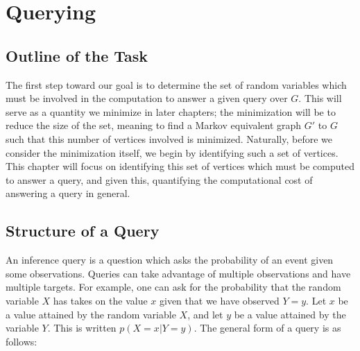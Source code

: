 \chapter{Querying}


\section{Outline of the Task}



\null \quad \quad The first step toward our goal is to determine the set of random variables which must be involved in the computation to answer a given query over $G$. This will serve as a quantity we minimize in later chapters; the minimization will be to reduce the size of the set, meaning to find a Markov equivalent graph $G'$ to $G$ such that this number of vertices involved is minimized. \newline
\null \quad \quad Naturally, before we consider the minimization itself, we begin by identifying such a set of vertices. This chapter will focus on identifying this set of vertices which must be computed to answer a query, and given this, quantifying the computational cost of answering a query in general. 

\section{Structure of a Query}

\null \quad \quad An inference query is a question which asks the probability of an event given some observations. Queries can take advantage of multiple observations and have multiple targets. For example, one can ask for the probability that the random variable $X$ has takes on the value $x$ given that we have observed $Y = y$. Let $x$ be a value attained by the random variable $X$, and let $y$ be a value attained by the variable $Y$. This is written $p(X=x|Y=y)$. The general form of a query is as follows:

